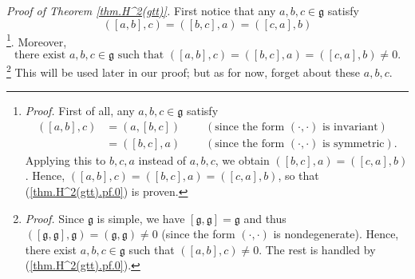 \documentclass[etingof-lie.tex]{subfiles}
\begin{document}
\textit{Proof of Theorem \ref{thm.H^2(gtt)}.} First notice that any
$a,b,c\in\mathfrak{g}$ satisfy%
\begin{equation}
\left(  \left[  a,b\right]  ,c\right)  =\left(  \left[  b,c\right]  ,a\right)
=\left(  \left[  c,a\right]  ,b\right)  \label{thm.H^2(gtt).pf.0}%
\end{equation}
\footnote{\textit{Proof.} First of all, any $a,b,c\in\mathfrak{g}$ satisfy%
\begin{align*}
\left(  \left[  a,b\right]  ,c\right)   &  =\left(  a,\left[  b,c\right]
\right)  \ \ \ \ \ \ \ \ \ \ \left(  \text{since the form }\left(  \cdot
,\cdot\right)  \text{ is invariant}\right) \\
&  =\left(  \left[  b,c\right]  ,a\right)  \ \ \ \ \ \ \ \ \ \ \left(
\text{since the form }\left(  \cdot,\cdot\right)  \text{ is symmetric}\right)
.
\end{align*}
Applying this to $b,c,a$ instead of $a,b,c$, we obtain $\left(  \left[
b,c\right]  ,a\right)  =\left(  \left[  c,a\right]  ,b\right)  $. Hence,
$\left(  \left[  a,b\right]  ,c\right)  =\left(  \left[  b,c\right]
,a\right)  =\left(  \left[  c,a\right]  ,b\right)  $, so that
(\ref{thm.H^2(gtt).pf.0}) is proven.}. Moreover,%
\begin{equation}
\text{there exist }a,b,c\in\mathfrak{g}\text{ such that }\left(  \left[
a,b\right]  ,c\right)  =\left(  \left[  b,c\right]  ,a\right)  =\left(
\left[  c,a\right]  ,b\right)  \neq0. \label{thm.H^2(gtt).pf.00}%
\end{equation}
\footnote{\textit{Proof.} Since $\mathfrak{g}$ is simple, we have $\left[
\mathfrak{g},\mathfrak{g}\right]  =\mathfrak{g}$ and thus $\left(  \left[
\mathfrak{g},\mathfrak{g}\right]  ,\mathfrak{g}\right)  =\left(
\mathfrak{g},\mathfrak{g}\right)  \neq0$ (since the form $\left(  \cdot
,\cdot\right)  $ is nondegenerate). Hence, there exist $a,b,c\in\mathfrak{g}$
such that $\left(  \left[  a,b\right]  ,c\right)  \neq0$. The rest is handled
by (\ref{thm.H^2(gtt).pf.0}).} This will be used later in our proof; but as
for now, forget about these $a,b,c$.
\end{document}
